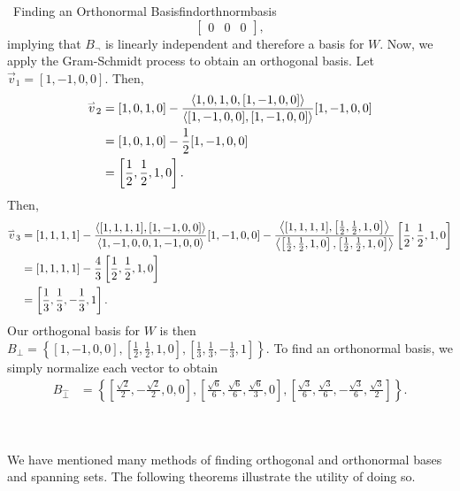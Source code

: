 \begin{example}{\Difficulty\,\Difficulty\,\,Finding an Orthonormal Basis}{findorthnormbasis}
\begin{equation*}
\begin{bmatrix}
                    0 & 0 & 0
                \end{bmatrix},
            \end{equation*}
            implying that \(B_\neg\) is linearly independent and therefore a basis for \(W\). Now, we apply the Gram-Schmidt process to obtain an orthogonal basis. Let \(\vec{v}_1=[1,-1,0,0]\). Then,
            \begin{align*}
                \overset{_{\rightharpoonup}}{v}_2&=[1,0,1,0]-\frac{\left\langle 1,0,1,0,[1,-1,0,0]\right\rangle}{\left\langle [1,-1,0,0],[1,-1,0,0]\right\rangle}[1,-1,0,0] \\
                &=[1,0,1,0]-\frac{1}{2}[1,-1,0,0] \\
                &=\left[\frac{1}{2},\frac{1}{2},1,0\right].
            \end{align*}
            Then,
            \begin{align*}
                \overset{_{\rightharpoonup}}{v}_3&=[1,1,1,1]-\frac{\left\langle [1,1,1,1],[1,-1,0,0]\right\rangle}{\left\langle 1,-1,0,0,1,-1,0,0\right\rangle}[1,-1,0,0]-\frac{\left\langle [1,1,1,1],\left[\frac{1}{2},\frac{1}{2},1,0\right]\right\rangle}{\left\langle \left[\frac{1}{2},\frac{1}{2},1,0\right],\left[\frac{1}{2},\frac{1}{2},1,0\right]\right\rangle}\left[\frac{1}{2},\frac{1}{2},1,0\right] \\
                &=[1,1,1,1]-\frac{4}{3}\left[\frac{1}{2},\frac{1}{2},1,0\right] \\
                &=\left[\frac{1}{3},\frac{1}{3},-\frac{1}{3},1\right].
            \end{align*}
            Our orthogonal basis for \(W\) is then \(B_\perp=\left\{[1,-1,0,0],\left[\frac{1}{2},\frac{1}{2},1,0\right],\left[\frac{1}{3},\frac{1}{3},-\frac{1}{3},1\right]\right\}\). To find an orthonormal basis, we simply normalize each vector to obtain
            \begin{align*}
                B_{\hat{\perp}}&=\left\{\left[\frac{\sqrt{2}}{2},-\frac{\sqrt{2}}{2},0,0\right],\left[\frac{\sqrt{6}}{6},\frac{\sqrt{6}}{6},\frac{\sqrt{6}}{3},0\right],\left[\frac{\sqrt{3}}{6},\frac{\sqrt{3}}{6},-\frac{\sqrt{3}}{6},\frac{\sqrt{3}}{2}\right]\right\}.
            \end{align*}
        \end{example}
        \pagebreak
        \vphantom
        \\
        \\
        We have mentioned many methods of finding orthogonal and orthonormal bases and spanning sets. The following theorems illustrate the utility of doing so.
